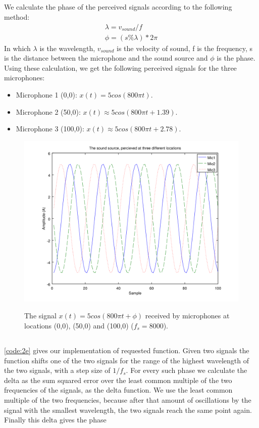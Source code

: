 \documentclass{article}
\begin{document}
\subsection{}
We calculate the phase of the perceived signals according to the following method:
\begin{align}
 \lambda = v_{sound} / f \\
 \phi = (s \% \lambda) * 2\pi
\end{align}
In which $\lambda$ is the wavelength, $v_{sound}$ is the velocity of sound, f is the frequency, s is the distance between the 
microphone and the sound source and $\phi$ is the phase.
Using these calculation, we get the following perceived signals for the three microphones:
\begin{itemize}
 \item Microphone 1 (0,0): $x(t) = 5cos(800 \pi t)$.
 \item Microphone 2 (50,0): $x(t) \approx 5cos(800 \pi t + 1.39)$.
 \item Microphone 3 (100,0): $x(t) \approx 5cos(800 \pi t + 2.78)$.
\end{itemize}

\begin{figure}[H]
  \centering
  \includegraphics[width=0.7\columnwidth]{plot2D.png}\\
  \caption{The signal $x(t) = 5cos(800 \pi t + \phi)$ received by microphones at locations (0,0), (50,0) and (100,0) ($f_s = 8000$).}
  \label{fig2d}
\end{figure}

\subsection{}
\autoref{code:2e} gives our implementation of requested function. Given two signals the function shifts one of the two signals
for the range of the highest wavelength of the two signals, with a step size of $1/f_s$. For every such phase we calculate the
delta as the sum squared error over the least common multiple of the two frequencies of the signals, as the delta function.
We use the least common multiple of the two frequencies, because after that amount of oscillations by the signal with the smallest
wavelength, the two signals reach the same point again. Finally this delta gives the phase 
\end{document}
